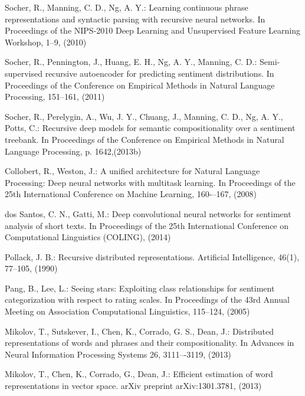 \documentclass{llncs}
\begin{document}
%
%
\begin{thebibliography}{5}

Socher, R., Manning, C. D., Ng, A. Y.:
Learning continuous phrase representations and syntactic parsing with recursive neural networks.
In Proceedings of the NIPS-2010 Deep Learning and Unsupervised Feature Learning Workshop, 1--9, (2010)

Socher, R., Pennington, J., Huang, E. H., Ng, A. Y., Manning, C. D.:
Semi-supervised recursive autoencoder for predicting sentiment distributions.
In Proceedings of the Conference on Empirical Methods in Natural Language Processing, 151--161, (2011)

Socher, R., Perelygin, A., Wu, J. Y., Chuang, J., Manning, C. D., Ng, A. Y., Potts, C.:
Recursive deep models for semantic compositionality over a sentiment treebank.
In Proceedings of the Conference on Empirical Methods in Natural Language Processing, p. 1642,(2013b)

Collobert, R., Weston, J.:
A unified architecture for Natural Language Processing: Deep neural networks with multitask learning. 
In Proceedings of the 25th International Conference on Machine Learning, 160-–167, (2008)

dos Santos, C. N., Gatti, M.:
Deep convolutional neural networks for sentiment analysis of short texts.
In Proceedings of the 25th International Conference on Computational Linguistics (COLING), (2014)

Pollack, J. B.: Recursive distributed representations. Artificial Intelligence, 46(1), 77--105, (1990)

Pang, B., Lee, L.:
Seeing stars: Exploiting class relationships for sentiment categorization with respect to rating scales.
In Proceedings of the 43rd Annual Meeting on Association Computational Linguistics, 115--124, (2005)

Mikolov, T., Sutskever, I., Chen, K., Corrado, G. S., Dean, J.:
Distributed representations of words and phrases and their compositionality.
In Advances in Neural Information Processing Systems 26, 3111–-3119, (2013)

Mikolov, T., Chen, K., Corrado, G., Dean, J.:
Efficient estimation of word representations in vector space.
arXiv preprint arXiv:1301.3781, (2013)

\end{thebibliography}
\end{document}
